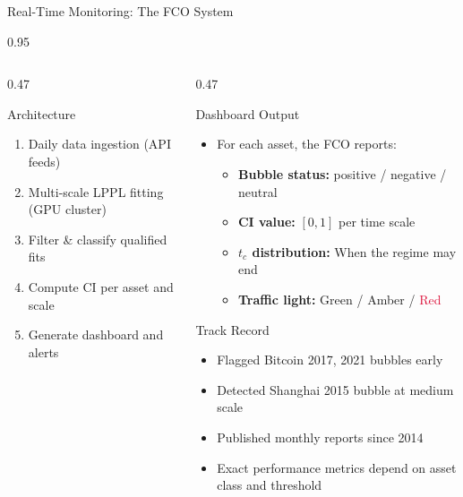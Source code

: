 \documentclass[9pt, aspectratio=169, t]{beamer}
\begin{document}
\begin{frame}{Real-Time Monitoring: The FCO System}
\begin{cminipage}{0.95\textwidth}
{\begin{columns}[T]
\begin{column}{0.47\textwidth}
            \begin{exampleblock}{Architecture}
                \begin{enumerate}\setlength{\itemsep}{0pt}
                    \item Daily data ingestion (API feeds)
                    \item Multi-scale LPPL fitting (GPU cluster)
                    \item Filter \& classify qualified fits
                    \item Compute CI per asset and scale
                    \item Generate dashboard and alerts
                \end{enumerate}
            \end{exampleblock}
        \end{column}
        \begin{column}{0.47\textwidth}
            \begin{block}{Dashboard Output}
                \begin{itemize}\setlength{\itemsep}{1pt}
                    \item For each asset, the FCO reports:
                    \begin{itemize}\setlength{\itemsep}{0pt}
                        \item \textbf{Bubble status:} positive / negative / neutral
                        \item \textbf{CI value:} $[0, 1]$ per time scale
                        \item \textbf{$t_c$ distribution:} When the regime may end
                        \item \textbf{Traffic light:} \textcolor{Forest}{Green} / \textcolor{Amber}{Amber} / \textcolor{Crimson}{Red}
                    \end{itemize}
                \end{itemize}
            \end{block}

            \begin{block}{Track Record}
                \begin{itemize}\setlength{\itemsep}{0pt}
                    \item Flagged Bitcoin 2017, 2021 bubbles early
                    \item Detected Shanghai 2015 bubble at medium scale
                    \item Published monthly reports since 2014
                    \item Exact performance metrics depend on asset class and threshold
                \end{itemize}
            \end{block}
        \end{column}
    \end{columns}
    }
    \end{cminipage}
\end{frame}
\end{document}
